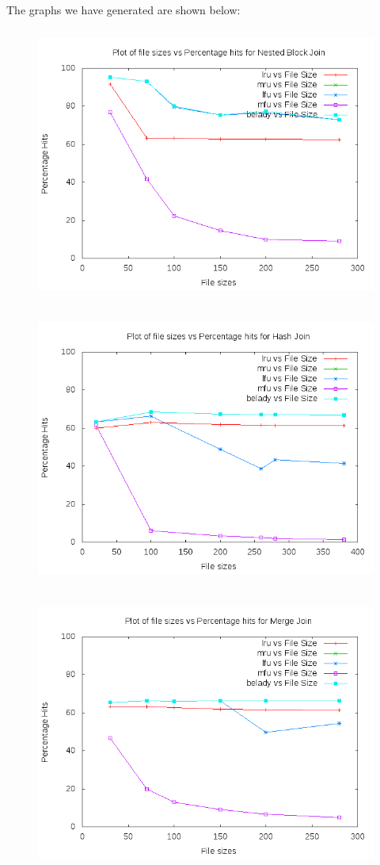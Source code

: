 The graphs we have generated are shown below:
\begin{figure}[H]
\includegraphics[width=12cm, height=9cm]{nestedblockjoinfilesize.png}

\end{figure}
\begin{figure}[H]
\includegraphics[width=12cm, height=9cm]{hashjoinfilesize.png}

\end{figure}
\begin{figure}[H]
\includegraphics[width=12cm, height=9cm]{mergejoinfilesize.png}

\end{figure}
